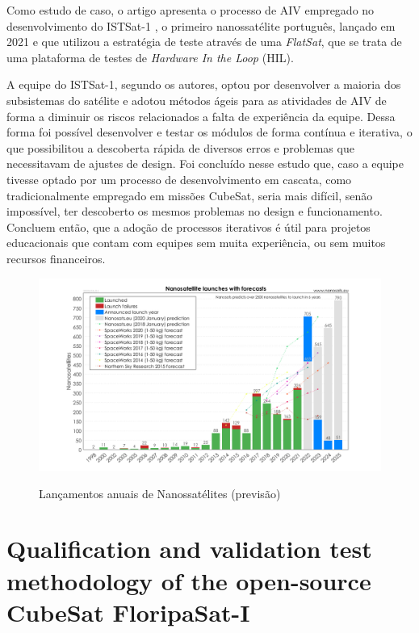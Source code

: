 Como estudo de caso, o artigo apresenta o processo de AIV empregado no desenvolvimento do ISTSat-1 \cite{istsat-1}, o primeiro nanossatélite português, lançado em 2021 e que utilizou a estratégia de teste através de uma \textit{FlatSat}, que se trata de uma plataforma de testes de \textit{Hardware In the Loop} (HIL).

A equipe do ISTSat-1, segundo os autores, optou por desenvolver a maioria dos subsistemas do satélite e adotou métodos ágeis para as atividades de AIV de forma a diminuir os riscos relacionados a falta de experiência da equipe. Dessa forma foi possível desenvolver e testar os módulos de forma contínua e iterativa, o que possibilitou a descoberta rápida de diversos erros e problemas que necessitavam de ajustes de design. Foi concluído nesse estudo que, caso a equipe tivesse optado por um processo de desenvolvimento em cascata, como tradicionalmente empregado em missões CubeSat, seria mais difícil, senão impossível, ter descoberto os mesmos problemas no design e funcionamento. Concluem então, que a adoção de processos iterativos é útil para projetos educacionais que contam com equipes sem muita experiência, ou sem muitos recursos financeiros.

\begin{figure}[h!]
    \centering
    \caption{Lançamentos anuais de Nanossatélites (previsão)}
    \includegraphics[width=\textwidth]{images/nanosat_years_forecast.png}
    \label{fig:nanosats_years_forecast}
\end{figure}


\section{Qualification and validation test methodology of the
open-source CubeSat FloripaSat-I \cite{marcelino2020-2}}


